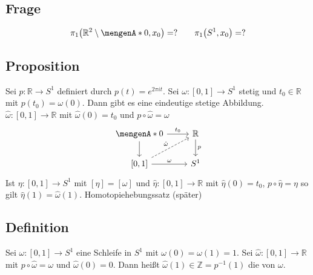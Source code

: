 \subsection{Frage} %
\label{sub:101}
\[
	\pi_1 \enbrace*{\mathds{R}^2 \setminus \set{0}, x_0 } = ? \qquad \pi_1 \enbrace*{S^1, x_0} = ?  
\]

\subsection{Proposition} %
\label{sub:102}
Sei $p  : \mathds{R} \to S^1$ definiert durch $p(t) = e^{2 \pi i t}$. Sei $\omega : [0,1] \to S^1$ stetig und $t_0 \in \mathds{R}$ mit $p(t_0) = \omega(0)$.
Dann gibt es eine eindeutige stetige Abbildung. $\hat{\omega} : [0,1] \to \mathds{R}$ mit $\hat{\omega}(0) = t_0$ und $p  \circ  \hat{\omega} = \omega$
\[
	\begin{tikzcd}
		\set{0} \rar{t_0} \dar& \mathds{R} \dar{p} \\
		{[0,1]} \rar{\omega} \urar[dashed]{\hat{\omega}}& S^1 
	\end{tikzcd}
\]
Ist $\eta : [0,1] \to S^1$ mit $[\eta] = [\omega]$ und $\hat{\eta} : [0,1] \to \mathds{R}$ mit $\hat{\eta}(0)= t_0$, $p \circ \hat{\eta} = \eta$ so gilt 
$\hat{\eta}(1) = \hat{\omega}(1)$.
Homotopiehebungssatz (später) \bewende

\subsection[Definition: Windungszahl]{Definition} %
\label{sub:103}
Sei $\omega : [0,1] \to S^1$ eine Schleife in $S^1$ mit $\omega(0) = \omega(1) = 1$. Sei $\hat{\omega} : [0,1] \to \mathds{R}$ mit $p \circ  \hat{\omega} = \omega$ und
$\hat{\omega}(0)=0$. Dann heißt $\hat{\omega}(1) \in \mathds{Z} = p^{-1}(1)$ die  von $\omega$. 

